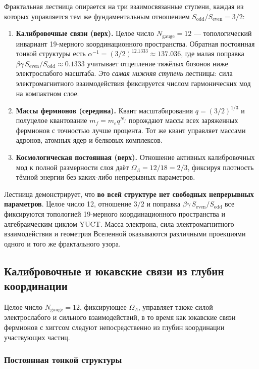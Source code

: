\documentclass[12pt,a4paper]{article}
\begin{document}
	Фрактальная лестница опирается на три взаимосвязанные ступени, каждая из которых управляется тем же фундаментальным отношением \(S_{\mathrm{odd}}/S_{\mathrm{even}} = 3/2\):
	
	\begin{enumerate}[leftmargin=*]
		\item \textbf{Калибровочные связи (верх).} Целое число \(N_{\mathrm{gauge}} = 12\) — топологический инвариант 19-мерного координационного пространства. Обратная постоянная тонкой структуры есть \(\alpha^{-1} = (3/2)^{12.1333} \approx 137.036\), где малая поправка \(\beta\gamma\,S_{\mathrm{even}}/S_{\mathrm{odd}} \approx 0.1333\) учитывает отцепление тяжёлых бозонов ниже электрослабого масштаба. Это \emph{самая нижняя ступень} лестницы: сила электромагнитного взаимодействия фиксируется числом гармонических мод на компактном слое.
		\item \textbf{Массы фермионов (середина).} Квант масштабирования \(q = (3/2)^{1/3}\) и полуцелое квантование \(m_f = m_e q^{N_f}\) порождают массы всех заряженных фермионов с точностью лучше процента. Тот же квант управляет массами адронов, атомных ядер и белковых комплексов.
		\item \textbf{Космологическая постоянная (верх).} Отношение активных калибровочных мод к полной размерности слоя даёт \(\Omega_\Lambda = 12/18 = 2/3\), фиксируя плотность тёмной энергии без каких-либо непрерывных параметров.
	\end{enumerate}
	
	Лестница демонстрирует, что \textbf{во всей структуре нет свободных непрерывных параметров}. Целое число 12, отношение \(3/2\) и поправка \(\beta\gamma\,S_{\mathrm{even}}/S_{\mathrm{odd}}\) все фиксируются топологией 19-мерного координационного пространства и алгебраическим циклом YUCT. Масса электрона, сила электромагнитного взаимодействия и геометрия Вселенной оказываются различными проекциями одного и того же фрактального узора.
	
	\subsection{Калибровочные и юкавские связи из глубин координации}
	
	Целое число \(N_{\mathrm{gauge}} = 12\), фиксирующее \(\Omega_\Lambda\), управляет также силой электрослабого и сильного взаимодействий, в то время как юкавские связи фермионов с хиггсом следуют непосредственно из глубин координации участвующих частиц.
	
	\subsubsection{Постоянная тонкой структуры}
	
\end{document}
